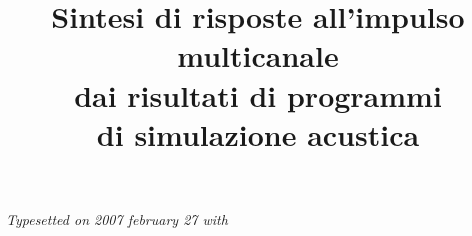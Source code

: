 \documentclass[a4paper,italian,12pt]{book}
\begin{document}
%
\setcounter{page}{1}
%
\title{Sintesi di risposte all'impulso multicanale\\[5mm] dai risultati di programmi\\[5mm] di simulazione acustica\\}
\providecommand{\autore}{SIMONE CAMPANINI}                        %
\providecommand{\principaladviser}{ANGELO FARINA}  %
\providecommand{\firstreader}{ANDREA CAPRA}            %
\providecommand{\secondreader}{PAOLO MARTIGNON}          %
\providecommand{\annoacc}{2005--2006}
\providecommand{\corso}{\uppercase{Elettronica}} %
\providecommand{\chiarmoprof}{Chiar.mo Prof.}
\providecommand{\dotting}{Dott. Ing.}
\providecommand{\dott}{Dott.}

\titlep

\pagestyle{fancy}
\renewcommand{\chaptermark}[1]{\markboth{#1}{}}
\renewcommand{\sectionmark}[1]{\markright{\thesection\ #1}}
\fancyhf{}
\fancyhead[LE,RO]{\bfseries\thepage}
\fancyhead[LO]{\bfseries\rightmark}
\fancyhead[RE]{\bfseries\leftmark}
\renewcommand{\headrulewidth}{0.5pt}
\renewcommand{\footrulewidth}{0pt}
\addtolength{\headheight}{0.5pt}
\addtolength{\headwidth}{1cm}
\fancypagestyle{plain}{\fancyhead{}\renewcommand{\headrulewidth}{0pt}}

\thispagestyle{empty}
\cleardoublepage

\newcommand{\ud}{\mathrm{d}}
\newcommand{\ue}{\mathrm{e}}
\newcommand{\um}{\textrm{m}}
\newcommand{\ums}{\textrm{ms}}
\newcommand{\ramsete}{\emph{Ramsete }}
\newcommand{\getir}{\emph{getIR }}

       

\newpage
\thispagestyle{empty}
\cleardoublepage

\pagestyle{fancy}
%
\tableofcontents
\listoffigures 
\listoftables 
%
\normalsize
%
\newpage
\thispagestyle{empty}
\cleardoublepage
%
\setcounter{page}{1}
       
      
      
      
      
      
      

\appendix
\renewcommand{\chaptermark}[1]{\markboth{{\appendixname}\ \thechapter.\hspace{1em}#1}{}}
      


%



\thispagestyle{empty}
\cleardoublepage

    

\newpage

\vspace*{9cm}
\thispagestyle{empty}
\centering
\em
Typesetted on 2007 february 27 with \LaTeXe
\end{document}

